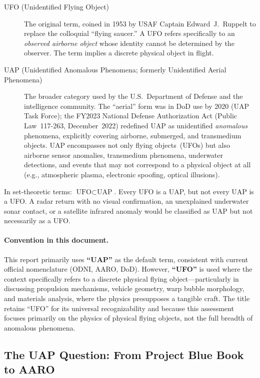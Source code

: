 \documentclass[aps,prd,twocolumn,superscriptaddress,nofootinbib,floatfix]{revtex4-2}
\begin{document}
\begin{description}
  \item[UFO (Unidentified Flying Object)] The original term, coined in 1953 by
    USAF Captain Edward~J.\ Ruppelt to replace the colloquial ``flying saucer.''
    A UFO refers specifically to an \emph{observed airborne object} whose
    identity cannot be determined by the observer. The term implies a discrete
    physical object in flight.
  \item[UAP (Unidentified Anomalous Phenomena; formerly Unidentified Aerial
    Phenomena)] The broader category used by the U.S.\ Department of Defense and
    the intelligence community. The ``aerial'' form was in DoD use by 2020 (UAP
    Task Force); the FY2023 National Defense Authorization Act (Public
    Law~117-263, December~2022) redefined UAP as unidentified \emph{anomalous}
    phenomena, explicitly covering airborne, submerged, and transmedium objects.
    UAP encompasses not only flying objects~(UFOs) but also airborne sensor
    anomalies, transmedium phenomena, underwater detections, and events that may
    not correspond to a physical object at all (e.g., atmospheric plasma,
    electronic spoofing, optical illusions).
\end{description}

\noindent
In set-theoretic terms: $\text{UFO}\subset\text{UAP}$. Every UFO is a UAP, but
not every UAP is a UFO. A radar return with no visual confirmation, an
unexplained underwater sonar contact, or a satellite infrared anomaly would be
classified as UAP but not necessarily as a UFO.

\paragraph{Convention in this document.}
This report primarily uses \textbf{``UAP''} as the default term, consistent with
current official nomenclature (ODNI, AARO, DoD). However, \textbf{``UFO''} is
used where the context specifically refers to a discrete physical flying
object---particularly in discussing propulsion mechanisms, vehicle geometry, warp
bubble morphology, and materials analysis, where the physics presupposes a
tangible craft. The title retains ``UFO'' for its universal recognizability and
because this assessment focuses primarily on the physics of physical flying
objects, not the full breadth of anomalous phenomena.

\subsection{The UAP Question: From Project Blue Book to AARO}\label{sec:bluebook-to-aaro}
\end{document}
